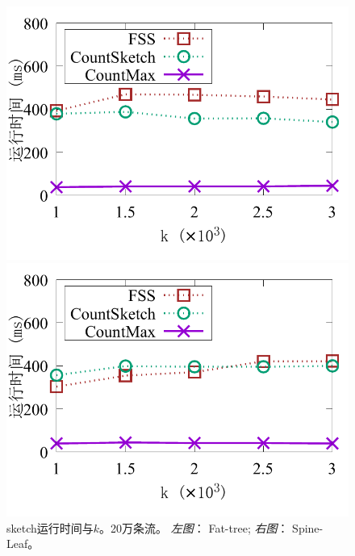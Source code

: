\begin{figure}[ht]
	\centering
	\begin{minipage}[t]{0.49\linewidth}
		\centering
		\includegraphics[width=\linewidth]{fig/ft_k_time_200000.pdf}
	\end{minipage}\vspace{-0.6em}%
	\begin{minipage}[t]{0.49\linewidth}
		\centering
		\includegraphics[width=\linewidth]{fig/hy_k_time_200000.pdf}
	\end{minipage}\vspace{-0.6em}
	\caption{\textnormal{sketch运行时间与$k$。20万条流。 \textit{左图}： Fat-tree; \textit{右图}： Spine-Leaf。}}
	\label{fig:time,k}
\end{figure}

